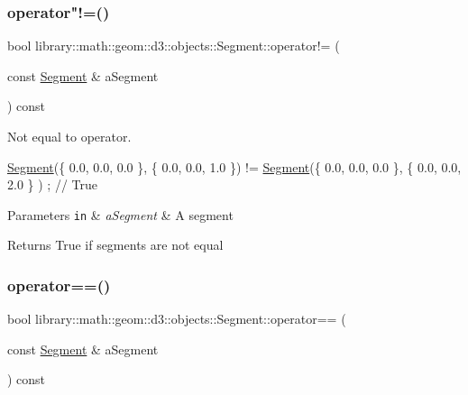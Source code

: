 \subsubsection{\texorpdfstring{operator"!=()}{operator!=()}}
{\footnotesize\ttfamily bool library\+::math\+::geom\+::d3\+::objects\+::\+Segment\+::operator!= (\begin{DoxyParamCaption}\item[{const \hyperlink{classlibrary_1_1math_1_1geom_1_1d3_1_1objects_1_1_segment}{Segment} \&}]{a\+Segment }\end{DoxyParamCaption}) const}



Not equal to operator. 


\begin{DoxyCode}
\hyperlink{classlibrary_1_1math_1_1geom_1_1d3_1_1objects_1_1_segment_a5562342d1edf2f52e37ce1bc138ee7d7}{Segment}(\{ 0.0, 0.0, 0.0 \}, \{ 0.0, 0.0, 1.0 \}) != \hyperlink{classlibrary_1_1math_1_1geom_1_1d3_1_1objects_1_1_segment_a5562342d1edf2f52e37ce1bc138ee7d7}{Segment}(\{ 0.0, 0.0, 0.0 \}, \{ 0.0, 0.0, 2.0 \}
      ) ; \textcolor{comment}{// True}
\end{DoxyCode}



\begin{DoxyParams}[1]{Parameters}
\mbox{\tt in}  & {\em a\+Segment} & A segment \\
\hline
\end{DoxyParams}
\begin{DoxyReturn}{Returns}
True if segments are not equal 
\end{DoxyReturn}
\mbox{\label{classlibrary_1_1math_1_1geom_1_1d3_1_1objects_1_1_segment_af6b462e74438f79ec6162fdefdfcb887}} 
\subsubsection{\texorpdfstring{operator==()}{operator==()}}
{\footnotesize\ttfamily bool library\+::math\+::geom\+::d3\+::objects\+::\+Segment\+::operator== (\begin{DoxyParamCaption}\item[{const \hyperlink{classlibrary_1_1math_1_1geom_1_1d3_1_1objects_1_1_segment}{Segment} \&}]{a\+Segment }\end{DoxyParamCaption}) const}



